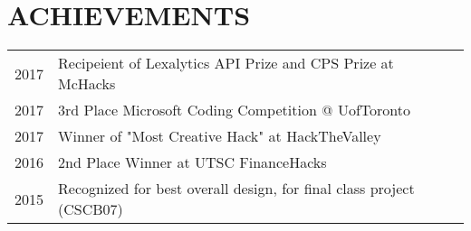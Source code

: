 \documentclass[]{deedy-resume-openfont}
\begin{document}
\begin{minipage}[t]{0.66\textwidth}

\section{ACHIEVEMENTS} 
\begin{tabular}{rll}
2017	     & Recipeient of Lexalytics API Prize and CPS Prize at McHacks\\
2017	     & 3rd Place Microsoft Coding Competition @ UofToronto\\
2017     & Winner of "Most Creative Hack" at HackTheValley \\
2016	     & 2nd Place Winner at UTSC FinanceHacks\\
2015	     & Recognized for best overall design, for final class project (CSCB07)\\

\end{tabular}
\sectionsep

\end{minipage} 
\end{document}
